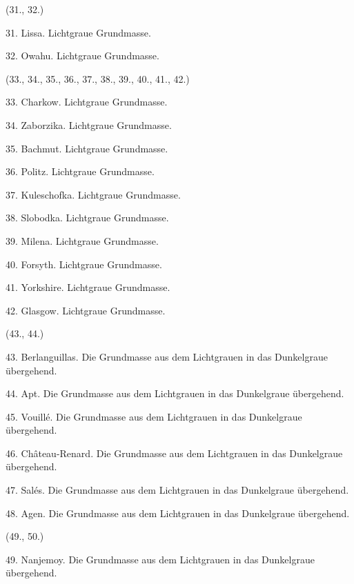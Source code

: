 \documentclass[a4paper, 11pt, oneside, polutonikogreek, german]{article}
\begin{document}
\vspace{2ex}

\begin{center}
(31., 32.)
\end{center}

31. Lissa. Lichtgraue Grundmasse.

32. Owahu. Lichtgraue Grundmasse.

\begin{center}
(33., 34., 35., 36., 37., 38., 39., 40., 41., 42.)
\end{center}

33. Charkow. Lichtgraue Grundmasse.

34. Zaborzika. Lichtgraue Grundmasse.

35. Bachmut. Lichtgraue Grundmasse.

36. Politz. Lichtgraue Grundmasse.

37. Kuleschofka. Lichtgraue Grundmasse.

38. Slobodka. Lichtgraue Grundmasse.

39. Milena. Lichtgraue Grundmasse.

40. Forsyth. Lichtgraue Grundmasse.

41. Yorkshire. Lichtgraue Grundmasse.

42. Glasgow. Lichtgraue Grundmasse.

\begin{center}
(43., 44.)
\end{center}

43. Berlanguillas. Die Grundmasse aus dem Lichtgrauen in das Dunkelgraue übergehend.

44. Apt. Die Grundmasse aus dem Lichtgrauen in das Dunkelgraue übergehend.

\vspace{2ex}

45. Vouillé. Die Grundmasse aus dem Lichtgrauen in das Dunkelgraue übergehend.

46. Château-Renard. Die Grundmasse aus dem Lichtgrauen in das Dunkelgraue übergehend.

47. Salés. Die Grundmasse aus dem Lichtgrauen in das Dunkelgraue übergehend.

48. Agen. Die Grundmasse aus dem Lichtgrauen in das Dunkelgraue übergehend.

\begin{center}
(49., 50.)
\end{center}

49. Nanjemoy. Die Grundmasse aus dem Lichtgrauen in das Dunkelgraue übergehend.
\end{document}
